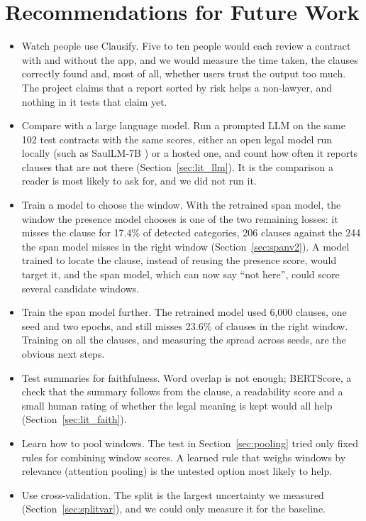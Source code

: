\section{Recommendations for Future Work}
\label{sec:futurework}
\begin{itemize}[itemsep=2pt]
  \item Watch people use Clausify. Five to ten people would each review a contract with and without the app, and we would measure the time taken, the clauses correctly found and, most of all, whether users trust the output too much. The project claims that a report sorted by risk helps a non-lawyer, and nothing in it tests that claim yet.
  \item Compare with a large language model. Run a prompted LLM on the same 102 test contracts with the same scores, either an open legal model run locally (such as SaulLM-7B \cite{colombo2024saullm}) or a hosted one, and count how often it reports clauses that are not there (Section~\ref{sec:lit_llm}). It is the comparison a reader is most likely to ask for, and we did not run it.
  \item Train a model to choose the window. With the retrained span model, the window the presence model chooses is one of the two remaining losses: it misses the clause for 17.4\% of detected categories, 206 clauses against the 244 the span model misses in the right window (Section~\ref{sec:spanv2}). A model trained to locate the clause, instead of reusing the presence score, would target it, and the span model, which can now say ``not here'', could score several candidate windows.
  \item Train the span model further. The retrained model used 6{,}000 clauses, one seed and two epochs, and still misses 23.6\% of clauses in the right window. Training on all the clauses, and measuring the spread across seeds, are the obvious next steps.
  \item Test summaries for faithfulness. Word overlap is not enough; BERTScore, a check that the summary follows from the clause, a readability score and a small human rating of whether the legal meaning is kept would all help (Section~\ref{sec:lit_faith}).
  \item Learn how to pool windows. The test in Section~\ref{sec:pooling} tried only fixed rules for combining window scores. A learned rule that weighs windows by relevance (attention pooling) is the untested option most likely to help.
  \item Use cross-validation. The split is the largest uncertainty we measured (Section~\ref{sec:splitvar}), and we could only measure it for the baseline.

\end{itemize}
